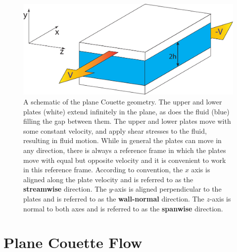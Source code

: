 \begin{figure}[h!]
\centerline{
\includegraphics[scale=0.4]{Figs/planeCouetteDiagram}}
\caption{A schematic of the plane Couette geometry. The upper and lower plates (white) extend infinitely in the plane, as does the fluid (blue) filling the gap between them. The upper and lower plates move with some constant velocity, and apply shear stresses to the fluid, resulting in fluid motion. While in general the plates can move in any direction, there is always a reference frame in which the plates move with equal but opposite velocity and it is convenient to work in this reference frame. According to convention, the $x$ axis is aligned along the plate velocity and is referred to as the {\bf streamwise} direction. The $y$-axis is aligned perpendicular to the plates and is referred to as the {\bf wall-normal} direction. The $z$-axis is normal to both axes and is referred to as the {\bf spanwise} direction.}\label{fig:planeCouette}
\end{figure}

\section{Plane Couette Flow} 

